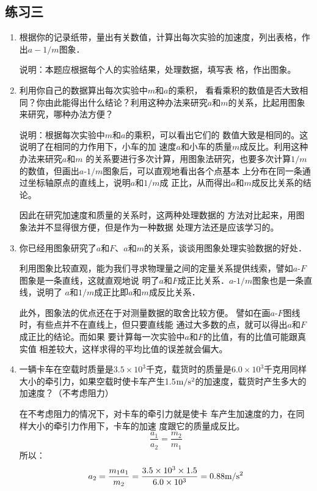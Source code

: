 \subsection{练习三}
\begin{enumerate}
	\item 根据你的记录纸带，量出有关数值，计算出每次实验的加速度，列出表格，作出$a-1/m$图象．
	 
    \begin{solution}
        说明：本题应根据每个人的实验结果，处理数据，填写表
格，作出图象。
    \end{solution}
\item 利用你自己的数据算出每次实验中$m$和$a$的乘积，
看看乘积的数值是否大致相同？你由此能得出什么结论？利用这种办法来研究$a$和$m$的关系，比起用图象来研究，哪种办法方便？
	 
\begin{solution}
    说明：根据每次实验中$m$和$a$的乘积，可以看出它们的
数值大致是相同的。这说明了在相同的力作用下，小车的加
速度$a$和小车的质量$m$成反比。利用这种办法来研究$a$和$m$
的关系要进行多次计算，用图象法研究，也要多次计算$1/m$
的数值，但画出$a$-$1/m$图象后，可以直观地看出各个点基本
上分布在同一条通过坐标轴原点的直线上，说明$a$和$1/m$成
正比，从而得出$a$和$m$成反比关系的结论。

因此在研究加速度和质量的关系时，这两种处理数据的
方法对比起来，用图象法并不显得很方便，但是作为一种数据
处理方法还是应该学习的。
\end{solution}
\item 你已经用图象研究了$a$和$F$、$a$和$m$的关系，谈谈用图象处理实验数据的好处．
	 
\begin{solution}
利用图象比较直观，能为我们寻求物理量之间的定量关系提供线索，譬如$a$-$F$图象是一条直线，这就直观地说
    明了$a$和$F$成正比关系．$a$-$1/m$图象也是一条直线，说明了
    $a$和$1/m$成正比即$a$和$m$成反比关系．

    此外，图象法的优点还在于对测量数据的取舍比较方便。
    譬如在画$a$-$F$图线时，有些点并不在直线上，但只要直线能
    通过大多数的点，就可以得出$a$和$F$成正比的结论。而如果
    要计算每一次实验中$a$和$F$的比值，有的比值可能跟真实值
    相差较大，这样求得的平均比值的误差就会偏大。    
\end{solution}
\item 一辆卡车在空载时质量是$3.5\times 10^3$千克，载货时的质量是$6.0\times 10^3$千克用同样大小的牵引力，如果空载时使卡车产生1.5$\text{m}/\text{s}^2$的加速度，载货时产生多大的加速度？（不考虑阻力）
	 
\begin{solution}
    在不考虑阻力的情况下，对卡车的牵引力就是使卡
车产生加速度的力，在同样大小的牵引力作用下，卡车的加速
度跟它的质量成反比。
\[\frac{a_1}{a_2}=\frac{m_2}{m_1}\]
所以：
\[a_2=\frac{m_1a_1}{m_2}=\frac{3.5\times 10^3\times 1.5}{6.0\times 10^3}=0.88\text{m}/\text{s}^2\]
\end{solution}
\end{enumerate}



